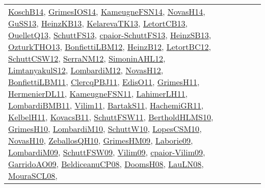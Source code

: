 {\begin{longtable}{llp{6cm}p{6cm}p{6cm}}
\href{papers/KoschB14.pdf}{KoschB14}\cite{KoschB14}, \href{articles/GrimesIOS14.pdf}{GrimesIOS14}\cite{GrimesIOS14}, \href{articles/KameugneFSN14.pdf}{KameugneFSN14}\cite{KameugneFSN14}, \href{articles/NovasH14.pdf}{NovasH14}\cite{NovasH14}, \href{papers/GuSS13.pdf}{GuSS13}\cite{GuSS13}, \href{papers/HeinzKB13.pdf}{HeinzKB13}\cite{HeinzKB13}, \href{papers/KelarevaTK13.pdf}{KelarevaTK13}\cite{KelarevaTK13}, \href{papers/LetortCB13.pdf}{LetortCB13}\cite{LetortCB13}, \href{papers/OuelletQ13.pdf}{OuelletQ13}\cite{OuelletQ13}, \href{papers/SchuttFS13.pdf}{SchuttFS13}\cite{SchuttFS13}, \href{papers/cpaior-SchuttFS13.pdf}{cpaior-SchuttFS13}\cite{cpaior-SchuttFS13}, \href{articles/HeinzSB13.pdf}{HeinzSB13}\cite{HeinzSB13}, \href{articles/OzturkTHO13.pdf}{OzturkTHO13}\cite{OzturkTHO13}, \href{papers/BonfiettiLBM12.pdf}{BonfiettiLBM12}\cite{BonfiettiLBM12}, \href{papers/HeinzB12.pdf}{HeinzB12}\cite{HeinzB12}, \href{papers/LetortBC12.pdf}{LetortBC12}\cite{LetortBC12}, \href{papers/SchuttCSW12.pdf}{SchuttCSW12}\cite{SchuttCSW12}, \href{papers/SerraNM12.pdf}{SerraNM12}\cite{SerraNM12}, \href{papers/SimoninAHL12.pdf}{SimoninAHL12}\cite{SimoninAHL12}, \href{articles/LimtanyakulS12.pdf}{LimtanyakulS12}\cite{LimtanyakulS12}, \href{articles/LombardiM12.pdf}{LombardiM12}\cite{LombardiM12}, \href{articles/NovasH12.pdf}{NovasH12}\cite{NovasH12}, \href{papers/BonfiettiLBM11.pdf}{BonfiettiLBM11}\cite{BonfiettiLBM11}, \href{papers/ClercqPBJ11.pdf}{ClercqPBJ11}\cite{ClercqPBJ11}, \href{papers/EdisO11.pdf}{EdisO11}\cite{EdisO11}, \href{papers/GrimesH11.pdf}{GrimesH11}\cite{GrimesH11}, \href{papers/HermenierDL11.pdf}{HermenierDL11}\cite{HermenierDL11}, \href{papers/KameugneFSN11.pdf}{KameugneFSN11}\cite{KameugneFSN11}, \href{papers/LahimerLH11.pdf}{LahimerLH11}\cite{LahimerLH11}, \href{papers/LombardiBMB11.pdf}{LombardiBMB11}\cite{LombardiBMB11}, \href{papers/Vilim11.pdf}{Vilim11}\cite{Vilim11}, \href{articles/BartakS11.pdf}{BartakS11}\cite{BartakS11}, \href{articles/HachemiGR11.pdf}{HachemiGR11}\cite{HachemiGR11}, \href{articles/KelbelH11.pdf}{KelbelH11}\cite{KelbelH11}, \href{articles/KovacsB11.pdf}{KovacsB11}\cite{KovacsB11}, \href{articles/SchuttFSW11.pdf}{SchuttFSW11}\cite{SchuttFSW11}, \href{papers/BertholdHLMS10.pdf}{BertholdHLMS10}\cite{BertholdHLMS10}, \href{papers/GrimesH10.pdf}{GrimesH10}\cite{GrimesH10}, \href{papers/LombardiM10.pdf}{LombardiM10}\cite{LombardiM10}, \href{papers/SchuttW10.pdf}{SchuttW10}\cite{SchuttW10}, \href{articles/LopesCSM10.pdf}{LopesCSM10}\cite{LopesCSM10}, \href{articles/NovasH10.pdf}{NovasH10}\cite{NovasH10}, \href{articles/ZeballosQH10.pdf}{ZeballosQH10}\cite{ZeballosQH10}, \href{papers/GrimesHM09.pdf}{GrimesHM09}\cite{GrimesHM09}, \href{papers/Laborie09.pdf}{Laborie09}\cite{Laborie09}, \href{papers/LombardiM09.pdf}{LombardiM09}\cite{LombardiM09}, \href{papers/SchuttFSW09.pdf}{SchuttFSW09}\cite{SchuttFSW09}, \href{papers/Vilim09.pdf}{Vilim09}\cite{Vilim09}, \href{papers/cpaior-Vilim09.pdf}{cpaior-Vilim09}\cite{cpaior-Vilim09}, \href{articles/GarridoAO09.pdf}{GarridoAO09}\cite{GarridoAO09}, \href{papers/BeldiceanuCP08.pdf}{BeldiceanuCP08}\cite{BeldiceanuCP08}, \href{papers/DoomsH08.pdf}{DoomsH08}\cite{DoomsH08}, \href{papers/LauLN08.pdf}{LauLN08}\cite{LauLN08}, \href{papers/MouraSCL08.pdf}{MouraSCL08}\cite{MouraSCL08}, 
\end{longtable}}
